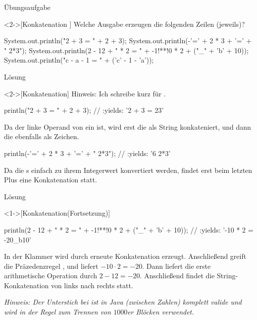 \begin{frame}[c,fragile]{Übungsaufgabe}
    \begin{exercise}<2->[Konkatenation ]
        \pause{}Welche Ausgabe erzeugen die folgenden Zeilen (jeweils)?\pause{}
        \begin{plainjava}
System.out.println("2 + 3 = " + 2 + 3);
System.out.println(-'=' + 2 * 3 + '=' + " 2*3");
System.out.println(2 - 12 + " * 2 = " + -1!**!0 * 2 + ("_" + 'b' + 10));
System.out.println("c - a - 1 = " + ('c' - 1 - 'a'));
        \end{plainjava}
    \end{exercise}
\end{frame}

\begin{frame}[c,fragile]{Lösung}
    \begin{solve}<2->[Konkatenation]
        \pause{}Hinweis: Ich schreibe  kurz für . \pause{}
\begin{plainjava}
println("2 + 3 = " + 2 + 3); // :yields: '2 + 3 = 23'
\end{plainjava}
    \pause{}Da der linke Operand von \bjava{+} ein  ist,\pause{} wird erst die  als String konkateniert,\pause{} und dann die  ebenfalls als Zeichen.\pause{}
\begin{plainjava}
println(-'=' + 2 * 3 + '=' + " 2*3"); // :yields: '6 2*3'
\end{plainjava}
    \pause{}Da die s einfach zu ihrem Integerwert konvertiert werden,\pause{} findet erst beim letzten Plus eine Konkatenation statt.
    \end{solve}
\end{frame}

\begin{frame}[c,fragile]{Lösung}
    \addtocounter{solve}{-1}
    \begin{solve}<1->[Konkatenation\hfill(Fortsetzung)]
\pause{}
\begin{plainjava}
println(2 - 12 + " * 2 = " + -1!**!0 * 2 + ("_" + 'b' + 10));
    // :yields: '-10 * 2 = -20_b10'
\end{plainjava}
    \pause{}In der Klammer wird durch erneute Konkatenation  erzeugt. Anschließend greift die Präzedenzregel ,\pause{} und liefert \(-10 \cdot 2 = -20\). \pause{}Dann liefert die erste arithmetische Operation durch \(2 - 12 = -20\).\pause{} Anschließend findet die String-Konkatenation von links nach rechts statt.\pause{}\medskip\par
    \textit{Hinweis: Der Unterstich bei  ist in Java (zwischen Zahlen) komplett valide\pause{} und wird in der Regel zum Trennen von \(1000\)er Blöcken verwendet.}
    \end{solve}
\end{frame}


